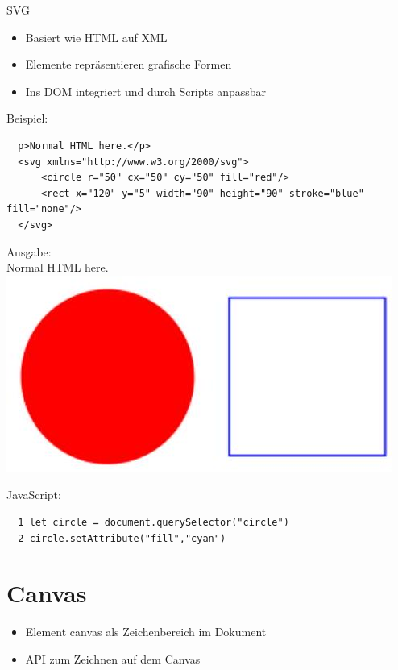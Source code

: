   SVG
  
  \begin{itemize}
    \item Basiert wie HTML auf XML
    \item Elemente repräsentieren grafische Formen
    \item Ins DOM integriert und durch Scripts anpassbar
  \end{itemize}
  
  Beispiel:
  
  \begin{verbatim}
  p>Normal HTML here.</p>
  <svg xmlns="http://www.w3.org/2000/svg">
      <circle r="50" cx="50" cy="50" fill="red"/>
      <rect x="120" y="5" width="90" height="90" stroke="blue" fill="none"/>
  </svg>
  \end{verbatim}
  
  Ausgabe:\\
  Normal HTML here.\\
  \includegraphics[width=\linewidth]{images/2024_12_29_858f09cde51177c71657g-27}
  
  JavaScript:
  
  \begin{verbatim}
  1 let circle = document.querySelector("circle")
  2 circle.setAttribute("fill","cyan")
  \end{verbatim}
  
  \section*{Canvas}
  \begin{itemize}
    \item Element canvas als Zeichenbereich im Dokument
    \item API zum Zeichnen auf dem Canvas
  \end{itemize}
  
